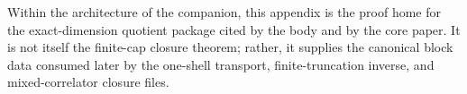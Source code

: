\begin{remark}
Within the architecture of the companion, this appendix is the proof home for the exact-dimension quotient package cited by the body and by the core paper. It is not itself the finite-cap closure theorem; rather, it supplies the canonical block data consumed later by the one-shell transport, finite-truncation inverse, and mixed-correlator closure files.
\end{remark}
